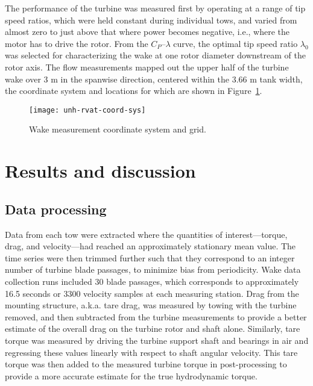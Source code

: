 The performance of the turbine was measured first by operating at a range of tip
speed ratios, which were held constant during individual tows, and varied from
almost zero to just above that where power becomes negative, i.e., where the
motor has to drive the rotor. From the $C_P$--$\lambda$ curve, the optimal tip
speed ratio $\lambda_0$ was selected for characterizing the wake at one rotor
diameter downstream of the rotor axis. The flow measurements mapped out the
upper half of the turbine wake over 3 m in the spanwise direction, centered
within the 3.66 m tank width, the coordinate system and locations for which are
shown in Figure~\ref{fig:RVAT-baseline-wake-coordinates}.

\begin{figure}
    \centering
    
    \texttt{[image: unh-rvat-coord-sys]}
    
    \caption{Wake measurement coordinate system and grid.}
    
    \label{fig:RVAT-baseline-wake-coordinates}
\end{figure}


\section{Results and discussion}

\subsection{Data processing}

Data from each tow were extracted where the quantities of interest---torque,
drag, and velocity---had reached an approximately stationary mean value. The
time series were then trimmed further such that they correspond to an integer
number of turbine blade passages, to minimize bias from periodicity. Wake data
collection runs included 30 blade passages, which corresponds to approximately
16.5 seconds or 3300 velocity samples at each measuring station. Drag from the
mounting structure, a.k.a. tare drag, was measured by towing with the turbine
removed, and then subtracted from the turbine measurements to provide a better
estimate of the overall drag on the turbine rotor and shaft alone. Similarly,
tare torque was measured by driving the turbine support shaft and bearings in
air and regressing these values linearly with respect to shaft angular velocity.
This tare torque was then added to the measured turbine torque in
post-processing to provide a more accurate estimate for the true hydrodynamic
torque.

